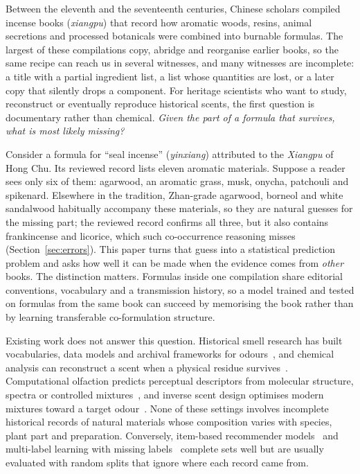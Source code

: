 \documentclass[10pt,a4paper]{article}
\makeatletter
\renewcommand{\section}{\@startsection{section}{1}{0pt}{12pt plus 2pt}{6pt}{\normalfont\normalsize\bfseries}}
\makeatother
\begin{document}
\section{Introduction}
\label{sec:intro}

Between the eleventh and the seventeenth centuries, Chinese scholars compiled incense books (\emph{xiangpu}) that record how aromatic woods, resins, animal secretions and processed botanicals were combined into burnable formulas. The largest of these compilations copy, abridge and reorganise earlier books, so the same recipe can reach us in several witnesses, and many witnesses are incomplete: a title with a partial ingredient list, a list whose quantities are lost, or a later copy that silently drops a component. For heritage scientists who want to study, reconstruct or eventually reproduce historical scents, the first question is documentary rather than chemical. \emph{Given the part of a formula that survives, what is most likely missing?}

Consider a formula for ``seal incense'' (\emph{yinxiang}) attributed to the \emph{Xiangpu} of Hong Chu. Its reviewed record lists eleven aromatic materials. Suppose a reader sees only six of them: agarwood, an aromatic grass, musk, onycha, patchouli and spikenard. Elsewhere in the tradition, Zhan-grade agarwood, borneol and white sandalwood habitually accompany these materials, so they are natural guesses for the missing part; the reviewed record confirms all three, but it also contains frankincense and licorice, which such co-occurrence reasoning misses (Section~\ref{sec:errors}). This paper turns that guess into a statistical prediction problem and asks how well it can be made when the evidence comes from \emph{other} books. The distinction matters. Formulas inside one compilation share editorial conventions, vocabulary and a transmission history, so a model trained and tested on formulas from the same book can succeed by memorising the book rather than by learning transferable co-formulation structure.

Existing work does not answer this question. Historical smell research has built vocabularies, data models and archival frameworks for odours~\cite{bembibre2017,lisena2022}, and chemical analysis can reconstruct a scent when a physical residue survives~\cite{paolin2026}. Computational olfaction predicts perceptual descriptors from molecular structure, spectra or controlled mixtures~\cite{keller2017,gutierrez2018,lee2023,debnath2021,hamel2024,sisson2025,thomasdanguin2014}, and inverse scent design optimises modern mixtures toward a target odour~\cite{aleixandre2024}. None of these settings involves incomplete historical records of natural materials whose composition varies with species, plant part and preparation. Conversely, item-based recommender models~\cite{steck2019,ning2011,cremonesi2010} and multi-label learning with missing labels~\cite{wu2015,zhao2018} complete sets well but are usually evaluated with random splits that ignore where each record came from.
\end{document}
